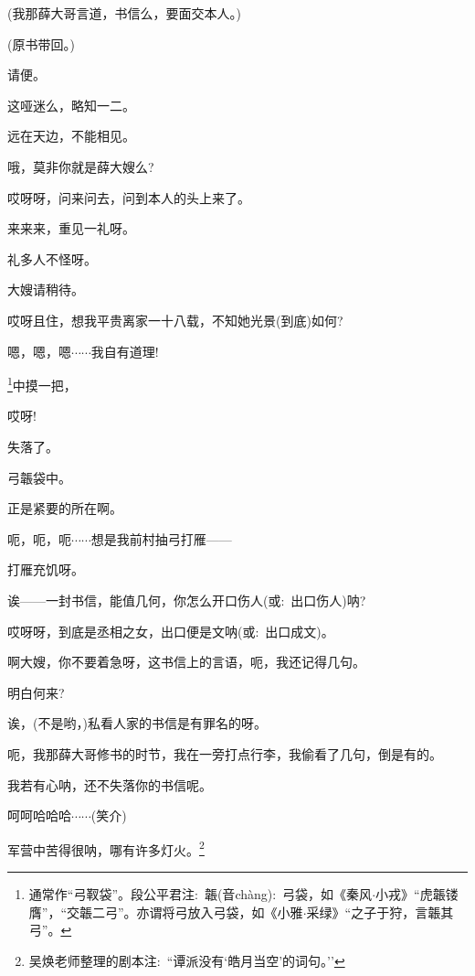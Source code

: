 {{{(我那薛大哥言道，书信么，要面交本人。)}

{(原书带回。)}

{请便。}

{这哑迷么，略知一二。}

{远在天边，不能相见。}

{哦，莫非你就是薛大嫂么?}

{哎呀呀，问来问去，问到本人的头上来了。}

{来来来，重见一礼呀。}

{礼多人不怪呀。}

{大嫂请稍待。}

{哎呀且住，想我平贵离家一十八载，不知她光景(到底)如何?}

{嗯，嗯，嗯$\cdots{}\cdots{}$我自有道理!}

\footnote{通常作``弓靫袋''。段公平{\scriptsize 君}注:~{韔(音{\textrm ch\`ang}):~弓袋，如《秦风$\cdot$小戎》``虎韔镂膺''，``交韔二弓''。亦谓将弓放入弓袋，如《小雅$\cdot$采绿》``之子于狩，言韔其弓''。}}{中摸一把，}

{哎呀!}


{失落了。}

{弓韔袋中。}

{正是紧要的所在啊。}

{呃，呃，呃$\cdots{}\cdots{}$想是我前村抽弓打雁------}

{打雁充饥呀。}

{诶------一封书信，能值几何，你怎么开口伤人({\akai 或}:~出口伤人)呐?}

{哎呀呀，到底是丞相之女，出口便是文呐({\akai 或}:~出口成文)。}

{啊大嫂，你不要着急呀，这书信上的言语，呃，我还记得几句。}

{明白何来?}

{诶，(不是哟，)私看人家的书信是有罪名的呀。}

{呃，我那薛大哥修书的时节，我在一旁打点行李，我偷看了几句，倒是有的。}

{我若有心呐，还不失落你的书信呢。}

{呵呵哈哈哈$\cdots{}\cdots{}$({\hwfs 笑介})}


{军营中苦得很呐，哪有许多灯火。}\footnote{吴焕老师整理的剧本注:~``谭派没有`皓月当空'的词句。''}

}}
